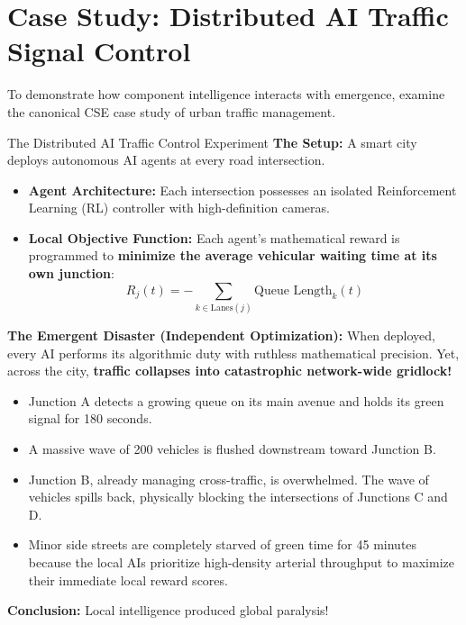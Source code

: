 \section{Case Study: Distributed AI Traffic Signal Control}
\label{sec:traffic_case_study}

To demonstrate how component intelligence interacts with emergence, examine the canonical CSE case study of urban traffic management.

\begin{examplebox}{The Distributed AI Traffic Control Experiment}
\textbf{The Setup:} A smart city deploys autonomous AI agents at every road intersection.
\begin{itemize}[leftmargin=1.5em]
    \item \textbf{Agent Architecture:} Each intersection possesses an isolated Reinforcement Learning (RL) controller with high-definition cameras.
    \item \textbf{Local Objective Function:} Each agent's mathematical reward is programmed to \textbf{minimize the average vehicular waiting time at its own junction}:
    \begin{equation}
        R_j(t) = - \sum_{k \in \text{Lanes}(j)} \text{Queue Length}_k(t)
    \end{equation}
\end{itemize}

\textbf{The Emergent Disaster (Independent Optimization):}
When deployed, every AI performs its algorithmic duty with ruthless mathematical precision. 
Yet, across the city, \textbf{traffic collapses into catastrophic network-wide gridlock!}
\begin{itemize}[leftmargin=1.5em]
    \item Junction A detects a growing queue on its main avenue and holds its green signal for 180 seconds.
    \item A massive wave of 200 vehicles is flushed downstream toward Junction B.
    \item Junction B, already managing cross-traffic, is overwhelmed. The wave of vehicles spills back, physically blocking the intersections of Junctions C and D.
    \item Minor side streets are completely starved of green time for 45 minutes because the local AIs prioritize high-density arterial throughput to maximize their immediate local reward scores.
\end{itemize}
\textbf{Conclusion:} Local intelligence produced global paralysis!


\end{examplebox}

